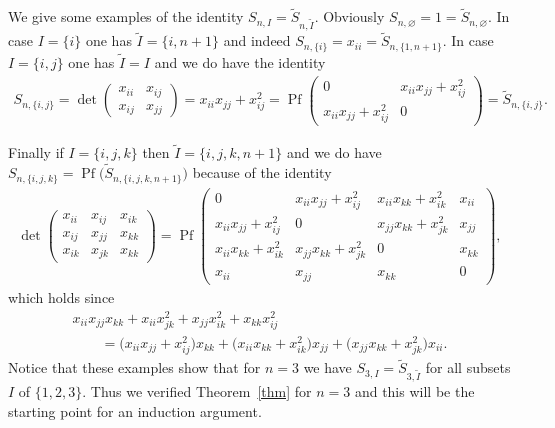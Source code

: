 \documentclass[pdftex]{sigma}
\newcommand{\tI}{{\tilde{I}}}
\newcommand{\tS}{{\tilde{S}}}
\numberwithin{equation}{section}
\begin{document}
\begin{Examples}
We give some examples of the identity $S_{n,I}=\tS_{n,\tI}$. Obviously $S_{n,\varnothing}=1=\tS_{n,\varnothing}$. In case $I=\{i\}$ one has $\tI=\{i,n+1\}$ and indeed $S_{n,\{i\}}=x_{ii}=\tS_{n,\{1,n+1\}}$. In case $I=\{i,j\}$ one has $\tI=I$ and we do have the identity
\begin{gather*}
S_{n,\{i,j\}} = \det \left(\begin{matrix} x_{ii}&x_{ij}\\x_{ij}&x_{jj}\end{matrix}\right)
 = x_{ii}x_{jj}+x_{ij}^2 =
\operatorname{Pf} \left(\begin{matrix} 0&x_{ii}x_{jj}+x_{ij}^2\\x_{ii}x_{jj}+x_{ij}^2&0\end{matrix}\right) = \tS_{n,\{i,j\}}.
\end{gather*}

Finally if $I=\{i,j,k\}$ then $\tI=\{i,j,k,n+1\}$ and we do have $S_{n,\{i,j,k\}}=\operatorname{Pf}\big(\tS_{n,\{i,j,k,n+1\}}\big)$ because of the identity
\begin{gather*}
\det \left(\begin{matrix} x_{ii}&x_{ij}&x_{ik}\\
x_{ij}&x_{jj}&x_{kk}\\
x_{ik}&x_{jk}&x_{kk}
\end{matrix}\right) = \operatorname{Pf} \left(\begin{matrix}
0&x_{ii}x_{jj}+x_{ij}^2&x_{ii}x_{kk}+x_{ik}^2&x_{ii}\\
x_{ii}x_{jj}+x_{ij}^2&0& x_{jj}x_{kk}+x_{jk}^2& x_{jj}\\
x_{ii}x_{kk}+x_{ik}^2& x_{jj}x_{kk}+x_{jk}^2 &0&x_{kk}\\
x_{ii}&x_{jj}&x_{kk}&0
\end{matrix}\right),
\end{gather*}
which holds since
\begin{gather*}
x_{ii}x_{jj}x_{kk}+x_{ii}x_{jk}^2 + x_{jj}x_{ik}^2 + x_{kk}x_{ij}^2\\
\qquad{} = \big(x_{ii}x_{jj}+x_{ij}^2\big)x_{kk}+\big(x_{ii}x_{kk}+x_{ik}^2\big)x_{jj}+\big(x_{jj}x_{kk}+x_{jk}^2\big)x_{ii}.
\end{gather*}
Notice that these examples show that for $n=3$ we have $S_{3,I} = \tS_{3,\tI}$ for all subsets $I$ of $\{1,2,3\}$. Thus we verified Theorem~\ref{thm} for $n=3$ and this will be the starting point for an induction argument.
\end{Examples}
\end{document}
